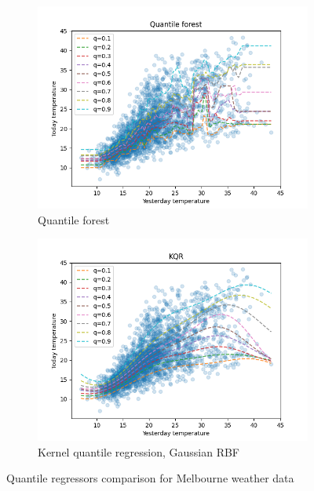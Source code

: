 \begin{figure}[!htp]
\begin{subfigure}[b]{0.5\linewidth}
      \vspace{4ex}
    \end{subfigure} 
    \begin{subfigure}[b]{0.5\linewidth}
      \centering
      \includegraphics[width=1.0\textwidth]{images/melbourne_quantile_forest.png} 
      \caption{Quantile forest} 
      \label{fig:melbourne_quantile_forest} 
    \end{subfigure}%
    \begin{subfigure}[b]{0.5\linewidth}
      \centering
      \includegraphics[width=1.0\textwidth]{images/melbourne_gaussian_rbf_kernel_quantile_regression.png}
      \caption{Kernel quantile regression, Gaussian RBF} 
      \label{fig:melborune_kernel_quantile_regression} 
    \end{subfigure} 
    \caption{Quantile regressors comparison for Melbourne weather data}
    \label{fig:melbourne_quantiles_comparison} 
  \end{figure}

